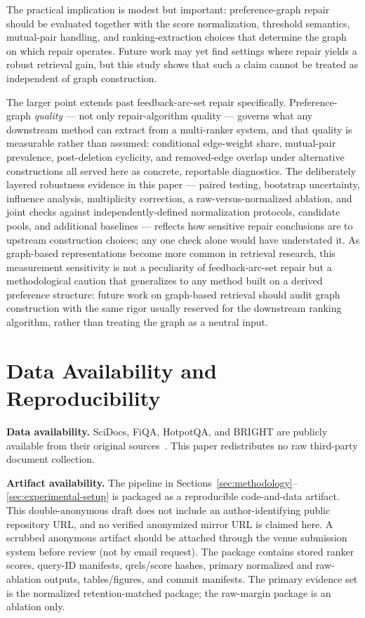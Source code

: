 \documentclass[manuscript,anonymous,review]{acmart}
\begin{document}
The practical implication is modest but important: preference-graph repair
should be evaluated together with the score normalization, threshold semantics,
mutual-pair handling, and ranking-extraction choices that determine the graph on
which repair operates. Future work may yet find settings where repair yields a
robust retrieval gain, but this study shows that such a claim cannot be treated
as independent of graph construction.

The larger point extends past feedback-arc-set repair specifically.
Preference-graph \emph{quality} --- not only repair-algorithm quality ---
governs what any downstream method can extract from a multi-ranker system,
and that quality is measurable rather than assumed: conditional edge-weight
share, mutual-pair prevalence, post-deletion cyclicity, and removed-edge
overlap under alternative constructions all served here as concrete,
reportable diagnostics. The deliberately layered robustness evidence in this
paper --- paired testing, bootstrap uncertainty, influence analysis,
multiplicity correction, a raw-versus-normalized ablation, and joint checks
against independently-defined normalization protocols, candidate pools, and
additional baselines --- reflects how sensitive repair conclusions are to
upstream construction choices; any one
check alone would have understated it. As graph-based representations become
more common in retrieval research, this measurement sensitivity is not a
peculiarity of feedback-arc-set repair but a methodological caution that
generalizes to any method built on a derived preference structure: future work
on graph-based retrieval should audit graph construction with the same rigor
usually reserved for the downstream ranking algorithm, rather than treating
the graph as a neutral input.

\section{Data Availability and Reproducibility}
\label{sec:data-availability}

\textbf{Data availability.} SciDocs, FiQA, HotpotQA, and BRIGHT are publicly
available from their original
sources~\cite{cohan2020scidocs,maia2018fiqa,yang2018hotpotqa,su2024bright}.
This paper redistributes no raw third-party document collection.

\textbf{Artifact availability.} The pipeline in
Sections~\ref{sec:methodology}--\ref{sec:experimental-setup} is packaged as a
reproducible code-and-data artifact. This double-anonymous draft does not
include an author-identifying public repository URL, and no verified anonymized
mirror URL is claimed here. A scrubbed anonymous artifact should be attached
through the venue submission system before review (not by email request). The
package contains stored ranker scores, query-ID manifests, qrels/score hashes,
primary normalized and raw-ablation outputs, tables/figures, and commit
manifests. The primary evidence set is the normalized retention-matched package;
the raw-margin package is an ablation only.
\end{document}
